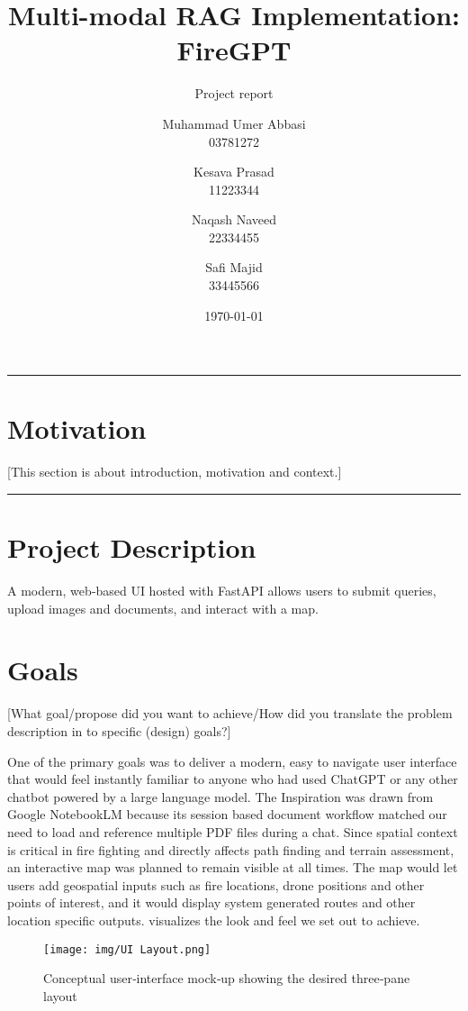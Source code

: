 \documentclass[lang=english,inputenc=utf8,fontsize=10pt]{ldvarticle}
\title{Multi-modal RAG Implementation: FireGPT}
\subtitle{Project report}
\author{Muhammad Umer Abbasi\\
03781272
\and
Kesava Prasad\\
11223344
\and
Naqash Naveed\\
22334455
\and
Safi Majid\\
33445566
}
\date{\today}
\begin{document}
\maketitle
\thispagestyle{empty}

\hrule

\section*{Motivation}

[This section is about introduction, motivation and context.] 

\lipsum[2-3]

\vspace*{1cm}
\hrule

\newpage

\section{Project Description}

A modern, web‑based UI hosted with FastAPI allows users to submit queries, upload images and documents, and interact with a map.

\section*{Goals}
[What goal/propose did you want to achieve/How did you translate the problem description in to specific (design) goals?] 

One of the primary goals was to deliver a modern, easy to navigate user interface that would feel instantly familiar to anyone who had used ChatGPT or any other chatbot powered by a large language model.
The Inspiration was drawn from Google NotebookLM because its session based document workflow matched our need to load and reference multiple PDF files during a chat.
Since spatial context is critical in fire fighting and directly affects path finding and terrain assessment, an interactive map was planned to remain visible at all times. The map would let users add geospatial inputs such as fire locations, drone positions and other points of interest, and it would display system generated routes and other location specific outputs.  visualizes the look and feel we set out to achieve.

\begin{figure}[htbp]
    \centering
    \texttt{[image: img/UI Layout.png]}
    \caption{Conceptual user‑interface mock‑up showing the desired three‑pane layout}
    \label{fig:UIBlock}
\end{figure}
\end{document}
